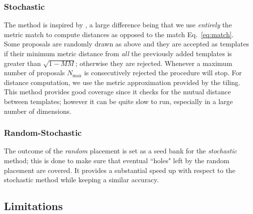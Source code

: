 \documentclass[twocolumn,showpacs,preprintnumbers,nofootinbib,prd,
superscriptaddress,10pt]{revtex4-2}
\begin{document}
\subsubsection{Stochastic}\label{par:stochastic}
The method is inspired by \cite{PhysRevD.80.104014}, a large difference being that we use {\it entirely} the metric match to compute distances as opposed to the match Eq.~\eqref{eq:match}.
\\
Some proposals are randomly drawn as above and they are accepted as templates if their minimum metric distance from {\it all} the previously added templates is greater than  $\sqrt{1-MM}$; otherwise they are rejected.
Whenever a maximum number of proposals $N_\text{max}$ is consecutively rejected the procedure will stop. For distance computation, we use the metric approximation provided by the tiling.
\\
This method provides good coverage since it checks for the mutual distance between templates; however it can be quite slow to run, especially in a large number of dimensions.

\subsubsection{Random-Stochastic}\label{par:randomstochastic}
The outcome of the {\it random} placement is set as a seed bank for the {\it stochastic} method; this is done to make sure that eventual ``holes" left by the random placement are covered. It provides a substantial speed up with respect to the stochastic method while keeping a similar accuracy.


\subsection{Limitations} \label{sec:limitations}
\end{document}

